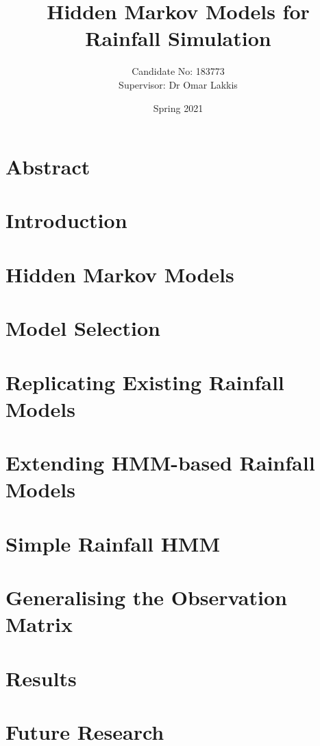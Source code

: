 \documentclass[a4paper,12pt]{report}
\title{\Huge Hidden Markov Models for Rainfall Simulation}
\author{Candidate No: 183773 \\ Supervisor: Dr Omar Lakkis}
\date{Spring 2021}
\theoremstyle{plain}
\begin{document}
    \maketitle

    \chapter*{Abstract}
    \label{Abstract}
    

	\tableofcontents

	\newpage

	\chapter{Introduction}
    \label{Introduction}
	
	\newpage

	\chapter{Hidden Markov Models}
	\label{Hidden_Markov}
	
	\newpage

	\chapter{Model Selection}
    \label{Model_Selection}
	
	\newpage

	\chapter{Replicating Existing Rainfall Models}
	\label{Replicating_Existing_Rainfall_Model}
    
	\newpage

	\chapter{Extending HMM-based Rainfall Models}
	\label{Extending_HMM_Based_Rainfall_Models}
    
	\newpage

	\chapter{Simple Rainfall HMM}
	\label{Simple_Rainfall_HMM}
    
	\newpage

	\chapter{Generalising the Observation Matrix}
	\label{Generalising_the_Observation_Matrix}
    
	\newpage

	\chapter{Results}
    \label{Results}
	
	\newpage

	\chapter{Future Research}
	\label{Future_Research}
    
	\newpage

	\nocite{*}
	\printbibliography
\end{document}
